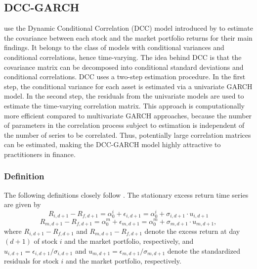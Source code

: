 \documentclass[11pt,a4paper]{article}
\begin{document}
\subsection{DCC-GARCH}

 use the Dynamic Conditional Correlation (DCC) model introduced by  to estimate the covariance between each stock and the market portfolio returns for their main findings. It belongs to the class of models with conditional variances and conditional correlations, hence time-varying. The idea behind DCC is that the covariance matrix can be decomposed into conditional standard deviations and conditional correlations. DCC uses a two-step estimation procedure. In the first step, the conditional variance for each asset is estimated via a univariate GARCH model. In the second step, the residuals from the univariate models are used to estimate the time-varying correlation matrix. This approach is computationally more efficient compared to multivariate GARCH approaches, because the number of parameters in the correlation process subject to estimation is independent of the number of series to be correlated. Thus, potentially large correlation matrices can be estimated, making the DCC-GARCH model highly attractive to practitioners in finance.



\subsubsection{Definition}

The following definitions closely follow . The stationary excess return time series are given by
\begin{equation}
    R_{i,d+1} - R_{f,d+1} = \alpha_0^i + \epsilon_{i,d+1} = \alpha_0^i + \sigma_{i,d+1} \cdot u_{i,d+1}
\end{equation}
\begin{equation}
    R_{m,d+1} - R_{f,d+1} = \alpha_0^m + \epsilon_{m,d+1} = \alpha_0^m + \sigma_{m,d+1} \cdot u_{m,d+1},
\end{equation}
where $R_{i,d+1} - R_{f,d+1}$ and $R_{m,d+1} - R_{f,d+1}$ denote the excess return at day $(d+1)$ of stock $i$ and the market portfolio, respectively, and $u_{i,d+1} = \epsilon_{i,d+1} / \sigma_{i,d+1}$ and $u_{m,d+1} = \epsilon_{m,d+1} / \sigma_{m,d+1}$ denote the standardized residuals for stock $i$ and the market portfolio, respectively.
\end{document}
